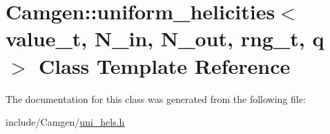 \hypertarget{a00546}{\section{Camgen\-:\-:uniform\-\_\-helicities$<$ value\-\_\-t, N\-\_\-in, N\-\_\-out, rng\-\_\-t, q $>$ Class Template Reference}
\label{a00546}
}


The documentation for this class was generated from the following file\-:\begin{DoxyCompactItemize}
\item 
include/\-Camgen/\hyperlink{a00795}{uni\-\_\-hels.\-h}\end{DoxyCompactItemize}

